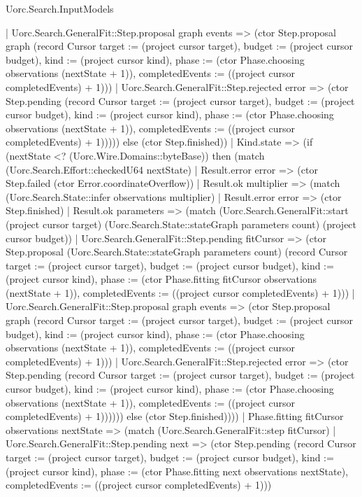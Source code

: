 \begin{lexlean}{Uorc.Search.InputModels}
\begin{semanticmodule}
{            | Uorc.Search.GeneralFit::Step.proposal graph events => (ctor Step.proposal graph (record Cursor {target := (project cursor target), budget := (project cursor budget), kind := (project cursor kind), phase := (ctor Phase.choosing observations (nextState + 1)), completedEvents := ((project cursor completedEvents) + 1)}))
            | Uorc.Search.GeneralFit::Step.rejected error => (ctor Step.pending (record Cursor {target := (project cursor target), budget := (project cursor budget), kind := (project cursor kind), phase := (ctor Phase.choosing observations (nextState + 1)), completedEvents := ((project cursor completedEvents) + 1)})))) else (ctor Step.finished))
        | Kind.state => (if (nextState <? (Uorc.Wire.Domains::byteBase)) then (match (Uorc.Search.Effort::checkedU64 nextState)
          | Result.error error => (ctor Step.failed (ctor Error.coordinateOverflow))
          | Result.ok multiplier => (match (Uorc.Search.State::infer observations multiplier)
            | Result.error error => (ctor Step.finished)
            | Result.ok parameters => (match (Uorc.Search.GeneralFit::start (project cursor target) (Uorc.Search.State::stateGraph parameters count) (project cursor budget))
              | Uorc.Search.GeneralFit::Step.pending fitCursor => (ctor Step.proposal (Uorc.Search.State::stateGraph parameters count) (record Cursor {target := (project cursor target), budget := (project cursor budget), kind := (project cursor kind), phase := (ctor Phase.fitting fitCursor observations (nextState + 1)), completedEvents := ((project cursor completedEvents) + 1)}))
              | Uorc.Search.GeneralFit::Step.proposal graph events => (ctor Step.proposal graph (record Cursor {target := (project cursor target), budget := (project cursor budget), kind := (project cursor kind), phase := (ctor Phase.choosing observations (nextState + 1)), completedEvents := ((project cursor completedEvents) + 1)}))
              | Uorc.Search.GeneralFit::Step.rejected error => (ctor Step.pending (record Cursor {target := (project cursor target), budget := (project cursor budget), kind := (project cursor kind), phase := (ctor Phase.choosing observations (nextState + 1)), completedEvents := ((project cursor completedEvents) + 1)}))))) else (ctor Step.finished))))
    | Phase.fitting fitCursor observations nextState => (match (Uorc.Search.GeneralFit::step fitCursor)
      | Uorc.Search.GeneralFit::Step.pending next => (ctor Step.pending (record Cursor {target := (project cursor target), budget := (project cursor budget), kind := (project cursor kind), phase := (ctor Phase.fitting next observations nextState), completedEvents := ((project cursor completedEvents) + 1)}))
}
\end{semanticmodule}
\end{lexlean}
